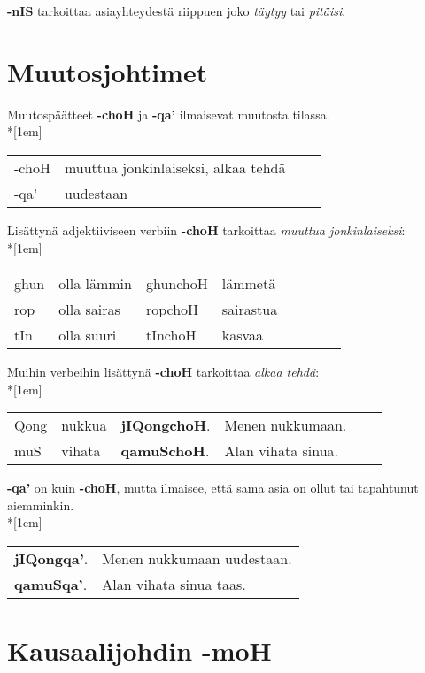 \documentclass{book}
\begin{document}
\textbf{-nIS} tarkoittaa asiayhteydestä riippuen joko \textit{täytyy} tai \textit{pitäisi}.

\section{Muutosjohtimet}

Muutospäätteet \textbf{-choH} ja \textbf{-qa'} ilmaisevat muutosta tilassa.\\*[1em]
\begin{tabular}{Bl Il}
    -choH & muuttua jonkinlaiseksi, alkaa tehdä \\
    -qa' & uudestaan \\
\end{tabular}

Lisättynä adjektiiviseen verbiin \textbf{-choH} tarkoittaa \textit{muuttua jonkinlaiseksi}:\\*[1em]
\begin{tabular}{Bl Il | Bl Il}
    ghun & olla lämmin & ghunchoH & lämmetä \\
    rop & olla sairas & ropchoH & sairastua \\
    tIn & olla suuri & tInchoH & kasvaa \\
\end{tabular}

Muihin verbeihin lisättynä \textbf{-choH} tarkoittaa \textit{alkaa tehdä}:\\*[1em]
\begin{tabular}{Bl Il | l l}
    Qong & nukkua & \textbf{jIQongchoH}. & Menen nukkumaan. \\
    muS & vihata & \textbf{qamuSchoH}. & Alan vihata sinua. \\
\end{tabular}

\textbf{-qa'} on kuin \textbf{-choH}, mutta ilmaisee, että sama asia on ollut tai tapahtunut aiemminkin.\\*[1em]
\begin{tabular}{l l}
    \textbf{jIQongqa'}. & Menen nukkumaan uudestaan. \\
    \textbf{qamuSqa'}. & Alan vihata sinua taas. \\
\end{tabular}

\section{Kausaalijohdin -moH}
\end{document}
